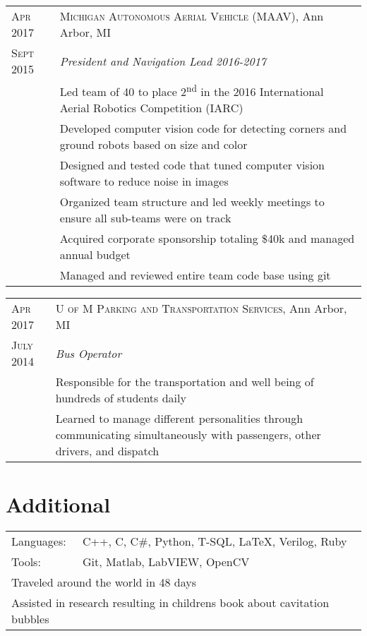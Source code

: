 \documentclass[a4paper,12pt]{article} %
\begin{document}

\begin{tabular}{R{2.1cm}|p{15.5cm}}
\textsc{Apr 2017} & \textsc{Michigan Autonomous Aerial Vehicle (MAAV)}, Ann Arbor, MI\\
\textsc{Sept 2015} & \emph{President and Navigation Lead 2016-2017} \\
& \footnotesize{Led team of 40 to place 2\textsuperscript{nd} in the 2016
  International Aerial Robotics Competition (IARC)} \\
& \footnotesize{Developed computer vision code for detecting corners and
  ground robots based on size and color} \\
& \footnotesize{Designed and tested code that tuned computer vision software to
  reduce noise in images} \\
& \footnotesize{Organized team structure and led weekly meetings to ensure all
  sub-teams were on track} \\
& \footnotesize{Acquired corporate sponsorship totaling \$40k and managed annual
  budget} \\
& \footnotesize{Managed and reviewed entire team code base using git} \\
\end{tabular}


\begin{tabular}{R{2.1cm}|p{15.5cm}}
\textsc{Apr 2017} & \textsc{U of M Parking and Transportation Services}, Ann Arbor, MI\\
\textsc{July 2014} & \emph{Bus Operator} \\
& \footnotesize{Responsible for the transportation and well being of hundreds
  of students daily} \\
& \footnotesize{Learned to manage different personalities through communicating
  simultaneously with passengers, other drivers, and dispatch} \\
\end{tabular}


\section{Additional}

\begin{tabular}{ll}
Languages: & C++, C, C\#, Python, T-SQL, \LaTeX, Verilog, Ruby \\
Tools: & Git, Matlab, LabVIEW, OpenCV \\
\multicolumn{2}{l}{Traveled around the world in 48 days}\\
\multicolumn{2}{l}{Assisted in research resulting in childrens book about
  cavitation bubbles}\\
\end{tabular}

\clearpage %
\end{document}
